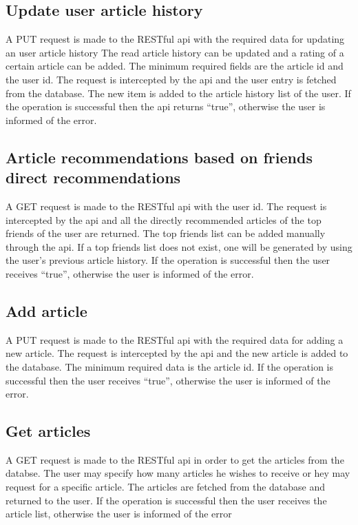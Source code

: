 \subsection{Update user article history}
\label{sec:workflow-update-user-article-history}
A PUT request is made to the RESTful api with the required data for updating an user article history
The read article history can be updated and a rating of a certain article can be added. 
The minimum required fields are the article id and the user id.
The request is intercepted by the api and the user entry is fetched from the database. The new item is added to the article history list of the user. If the operation is successful then the api returns “true”, otherwise the user is informed of the error. 

\subsection{Article recommendations based on friends direct recommendations}
\label{sec:workflow-friends-direct-recommendations}
A GET request is made to the RESTful api with the user id.
The request is intercepted by the api and all the directly recommended articles of the top friends of the user are returned.
The top friends list can be added manually through the api.
If a top friends list does not exist, one will be generated by using the user’s previous article history.
If the operation is successful then the user receives “true”, otherwise the user is informed of the error. 

\subsection{Add article}
\label{sec:workflow-add-article}
A PUT request is made to the RESTful api with the required data for adding a new article.
The request is intercepted by the api and the new article is added to the database.
The minimum required data is the article id.
If the operation is successful then the user receives “true”, otherwise the user is informed of the error.


\subsection{Get articles}
\label{sec:workflow-get-all-articles}
A GET request is made to the RESTful api in order to get the articles from the databse.
The user may specify how many articles he wishes to receive or hey may request for a specific article.
The articles are fetched from the database and returned to the user.
If the operation is successful then the user receives the article list, otherwise the user is informed of the error

